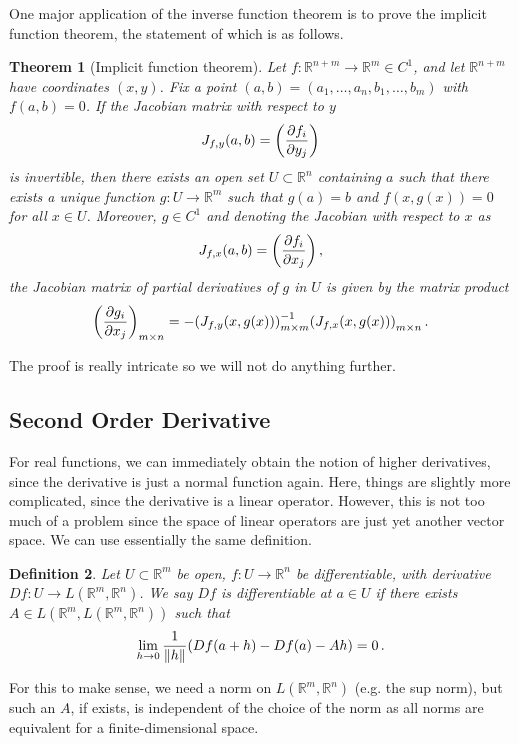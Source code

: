 \documentclass{article}
\theoremstyle{plain}\theoremheaderfont{\normalfont\itshape}\theorembodyfont{\rmfamily}\theoremseparator{.}\newtheorem*{rem}{Remark}\newtheorem*{ex}{Example}\newtheorem*{proof}{Proof}\newtheorem*{altp}{Alternative proof}
\theoremstyle{plain}\theoremheaderfont{\normalfont\bfseries}\theorembodyfont{\rmfamily}\theoremseparator{.}\newtheorem{thm}{Theorem}[section]\newtheorem{lem}[thm]{Lemma}\newtheorem{prop}[thm]{Proposition}\newtheorem*{cor}{Corollary}\newtheorem{defn}[thm]{Definition}\newtheorem{clm}[thm]{Claim}\newtheorem{clminproof}{Claim}
\theoremstyle{break}\theoremheaderfont{\normalfont\itshape}\theorembodyfont{\rmfamily}\theoremseparator{.\medskip}\newtheorem*{proofskip}{Proof}\newtheorem*{exs}{Examples}\newtheorem*{rems}{Remarks}
\theoremstyle{break}\theoremheaderfont{\normalfont\bfseries}\theorembodyfont{\rmfamily}\theoremseparator{.\medskip}\newtheorem{lemskip}[thm]{Lemma}\newtheorem{defnskip}[thm]{Definition}\newtheorem{propskip}[thm]{Proposition}\newtheorem{thmskip}[thm]{Theorem}
\begin{document}
    One major application of the inverse function theorem is to prove the implicit function theorem, the statement of which is as follows.

    \begin{thm}[Implicit function theorem]
        Let \(f:\mathbb{R}^{n+m}\to\mathbb{R}^m\in C^1\), and let \(\mathbb{R}^{n+m}\) have coordinates \((x,y)\). Fix a point \((a,b)=(a_1,\dots,a_n,b_1,\dots,b_m)\) with \(f(a,b)=0\). If the Jacobian matrix with respect to \(y\)
        \[J_{f,y}(a,b)=\qty(\pdv{f_i}{y_j}(a,b))\]
        is invertible, then there exists an open set \(U\subset\mathbb{R}^n\) containing \(a\) such that there exists a unique function \(g:U\to\mathbb{R}^m\) such that \(g(a)=b\) and \(f(x,g(x))=0\) for all \(x\in U\). Moreover, \(g\in C^1\) and denoting the Jacobian with respect to \(x\) as
        \[J_{f,x}(a,b)=\qty(\pdv{f_i}{x_j}(a,b))\,,\]
        the Jacobian matrix of partial derivatives of \(g\) in \(U\) is given by the matrix product
        \[\qty(\pdv{g_i}{x_j}(x))_{m\times n}=-\qty(J_{f,y}(x,g(x)))^{-1}_{m\times m}\qty(J_{f,x}(x,g(x)))_{m\times n}\,.\]
    \end{thm}

    The proof is really intricate so we will not do anything further.
    \subsection{Second Order Derivative}
    For real functions, we can immediately obtain the notion of higher derivatives, since the derivative is just a normal function again. Here, things are slightly more complicated, since the derivative is a linear operator. However, this is not too much of a problem since the space of linear operators are just yet another vector space. We can use essentially the same definition.
    \begin{defn}
        Let \(U\subset\mathbb{R}^m\) be open, \(f:U\to\mathbb{R}^n\) be differentiable, with derivative \(Df:U\to L(\mathbb{R}^m,\mathbb{R}^n)\). We say \(Df\) is differentiable at \(a\in U\) if there exists \(A\in L(\mathbb{R}^m,L(\mathbb{R}^m,\mathbb{R}^n))\) such that
        \[\lim_{h\to 0}\frac{1}{\norm{h}}(Df(a+h)-Df(a)-Ah)=0\,.\]
    \end{defn}

    For this to make sense, we need a norm on \(L(\mathbb{R}^m,\mathbb{R}^n)\) (e.g. the sup norm), but such an \(A\), if exists, is independent of the choice of the norm as all norms are equivalent for a finite-dimensional space.
\end{document}
